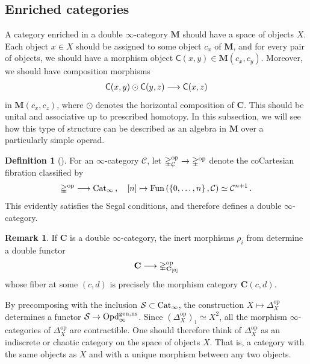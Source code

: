 \documentclass[10pt]{amsart}
\numberwithin{equation}{section}
\theoremstyle{definition}
\newtheorem{definition}[prop]{Definition}
\newtheorem{rem}[prop]{Remark}
\DeclareMathOperator{\Fun}{Fun}
\DeclareMathOperator{\op}{op}
\newcommand{\Cat}{\mathrm{Cat}\vphantom{t}}
\newcommand{\Simp}{\mathbb{\Delta}}
\newcommand{\cC}{\mathcal{C}}
\newcommand{\cS}{\mathcal{S}}
\newcommand{\bfC}{\mathbf{C}}
\newcommand{\bfM}{\mathbf{M}}
\newcommand{\sfC}{\mathsf{C}}
\newcommand{\Opd}{\mathrm{Opd}^{\mathrm{gen,ns}}_{\infty}}
\renewcommand{\to}{\mathchoice{\longrightarrow}{\rightarrow}{}{}}
\begin{document}
	\subsection{Enriched categories}\label{subsec:categorical_algebras}

	A category enriched in a double $\infty$-category $\bfM$ should have a space of objects $X$. Each object $x\in X$ should be assigned to some object $c_{x}$ of $\bfM$, and for every pair of objects, we should have a morphism object $\sfC(x,y) \in \bfM(c_{x},c_{y})$.
  Moreover, we should have composition morphisms
	\begin{align*}
		\sfC(x,y) \odot \sfC(y,z) \to \sfC(x,z)
	\end{align*}
	in $\bfM(c_{x},c_{z})$, where $\odot$ denotes the horizontal composition of $\bfC$.
  This should be unital and associative up to prescribed homotopy. In this subsection, we will see how this type of structure can be described as an algebra in $\bfM$ over a particularly simple operad.

	\begin{definition}[{\cite*[Definition 4.1.1]{GH}}] \label{def:indiscrete_category}
		For an  $\infty$-category $\cC$, let $\Simp^{\op}_{\cC}\to \Simp^{\op}$ denote the coCartesian fibration classified by
		\begin{align*}
			\Simp^{\op} \to \Cat_{\infty} \,, \quad [n] \mapsto \Fun\left( \left\{ 0,\dots, n\right\}, \cC \right) \simeq \cC^{n+1} \,.
		\end{align*}
		This evidently satisfies the Segal conditions, and therefore defines a double $\infty$-category.
	\end{definition}

	\begin{rem}\label{rem:C->Delta_C_0}
		If $\bfC$ is a double $\infty$-category, the inert morphisms $\rho_{i}$ from  determine a double functor
		\begin{align*}
			\bfC \to \Simp^{\op}_{\bfC_{[0]}}
		\end{align*}
		whose fiber at some $(c,d)$ is precisely the morphism category $\bfC(c,d)$.
	\end{rem}

	By precomposing with the inclusion $\cS\subset \Cat_{\infty}$, the construction $X\mapsto \Simp^{\op}_{X}$ determines a functor $\cS \to \Opd$.
  Since $(\Simp^{\op}_{X})_{1} \simeq X^{2}$, all the morphism $\infty$-categories of $\Simp^{\op}_{X}$ are contractible.
	One should therefore think of $\Simp^{\op}_{X}$ as an indiscrete or chaotic category on the space of objects $X$.
	That is, a category with the same objects as $X$ and with a unique morphism between any two objects.
\end{document}
